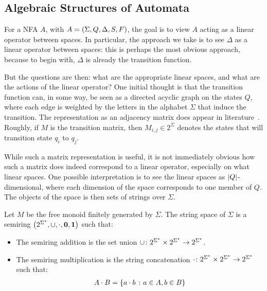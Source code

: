 \documentclass[12pt]{article}
\begin{document}
\subsection{Algebraic Structures of Automata}

For a NFA \(A\), with \(A = \left(\Sigma, Q, \Delta, S, F\right)\),
the goal is to view \(A\) acting as a linear operator between spaces.
In particular, the approach we take is to see \(\Delta\) as a
linear operator between spaces: this is perhaps the most obvious approach,
because to begin with, \(\Delta\) is already the transition function.

But the questions are then:
what are the appropriate linear spaces,
and what are the actions of the linear operator?
One initial thought is that the transition function can, in some way,
be seen as a directed acyclic graph on the states \(Q\),
where each edge is weighted by the letters in the alphabet \(\Sigma\)
that induce the transition.
The representation as an adjacency matrix does appear in
literature~\cite{savage1998models}.
Roughly, if \(M\) is the transition matrix, then \(M_{i, j} \in 2^{\Sigma}\)
denotes the states that will transition state \(q_i\) to \(q_j\).

While such a matrix representation is useful,
it is not immediately obvious how such a matrix does indeed correspond
to a linear operator, especially on what linear spaces.
One possible interpretation is to see
the linear spaces as \(\left\lvert Q\right\rvert\)-dimensional,
where each dimension of the space corresponds to one member of \(Q\).
The objects of the space is then sets of strings over \(\Sigma\).

\begin{definition}
  Let \(M\) be the free monoid finitely generated by \(\Sigma\).
  The string space of \(\Sigma\) is a semiring
  \(\left(2^{\Sigma^\star}, \cup, \cdot, \mathbf{0}, \mathbf{1}\right)\)
  such that:
  \begin{itemize}
    \item
      The semiring addition is the set union
      \(\cup \colon 2^{\Sigma^\star} \times 2^{\Sigma^\star} \to 2^{\Sigma^\star}\).

    \item
      The semiring multiplication is the string concatenation
      \(\cdot \colon 2^{\Sigma^\star} \times 2^{\Sigma^\star} \to 2^{\Sigma^\star}\)
      such that:
      \begin{align*}
        A \cdot B
          = \left\{a \cdot b \ \colon a \in A, b \in B\right\}
      \end{align*}
  \end{itemize}
\end{definition}
\end{document}
